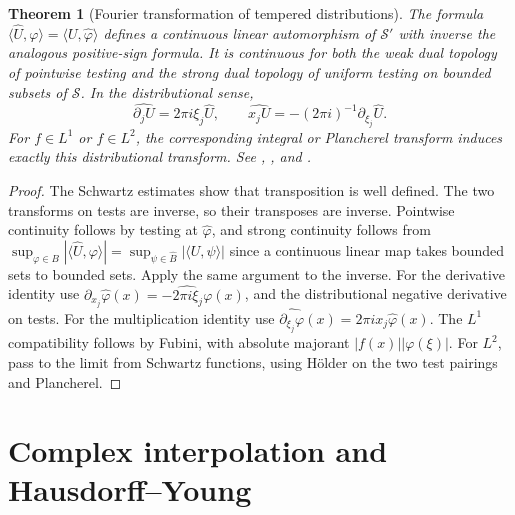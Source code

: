\documentclass[11pt,oneside,openany]{book}
\newtheorem{theorem}{Theorem}[chapter]
\theoremstyle{definition}
\theoremstyle{remark}
\begin{document}
\begin{theorem}[Fourier transformation of tempered distributions]
\label{p102:AN-11-C03-R01}
The formula \(\langle\widehat U,\varphi\rangle=\langle U,\widehat\varphi\rangle\) defines a continuous linear automorphism of \(\mathcal S'\) with inverse the analogous positive-sign formula. It is continuous for both the weak dual topology of pointwise testing and the strong dual topology of uniform testing on bounded subsets of \(\mathcal S\). In the distributional sense,
\[
 \widehat{\partial_j U}=2\pi i\xi_j\widehat U,
 \qquad \widehat{x_j U}=-(2\pi i)^{-1}\partial_{\xi_j}\widehat U.
\]
For \(f\in L^1\) or \(f\in L^2\), the corresponding integral or Plancherel transform induces exactly this distributional transform. See \cite[\S\S2.2--2.3]{grafakos}, \cite[\S\S10.4 and 10.7]{leoni}, and \cite[Chapter 7]{rudin}.
\end{theorem}
\begin{proof}
The Schwartz estimates show that transposition is well defined. The two transforms on tests are inverse, so their transposes are inverse. Pointwise continuity follows by testing at \(\widehat\varphi\), and strong continuity follows from \(\sup_{\varphi\in B}|\langle\widehat U,\varphi\rangle|=\sup_{\psi\in\widehat B}|\langle U,\psi\rangle|\) since a continuous linear map takes bounded sets to bounded sets. Apply the same argument to the inverse. For the derivative identity use \(\partial_{x_j}\widehat\varphi(x)=\widehat{-2\pi i\xi_j\varphi}(x)\), and the distributional negative derivative on tests. For the multiplication identity use \(\widehat{\partial_{\xi_j}\varphi}(x)=2\pi i x_j\widehat\varphi(x)\). The \(L^1\) compatibility follows by Fubini, with absolute majorant \(|f(x)||\varphi(\xi)|\). For \(L^2\), pass to the limit from Schwartz functions, using Hölder on the two test pairings and Plancherel.
\end{proof}

\section{Complex interpolation and Hausdorff--Young}
\end{document}
